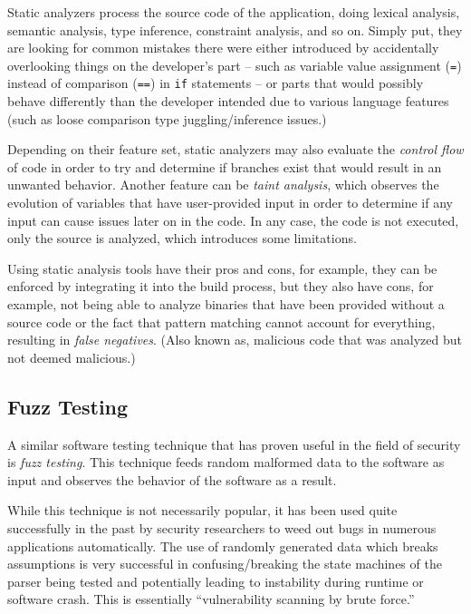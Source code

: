 \documentclass[a4paper,12pt]{article}
\begin{document}
	Static analyzers process the source code of the application, doing lexical analysis, semantic analysis, type inference, constraint analysis, and so on. Simply put, they are looking for common mistakes there were either introduced by accidentally overlooking things on the developer's part -- such as variable value assignment (\texttt{=}) instead of comparison (\texttt{==}) in \texttt{if} statements -- or parts that would possibly behave differently than the developer intended due to various language features (such as loose comparison type juggling/inference issues.)
	
	Depending on their feature set, static analyzers may also evaluate the \textit{control flow} of code in order to try and determine if branches exist that would result in an unwanted behavior. Another feature can be \textit{taint analysis}, which observes the evolution of variables that have user-provided input in order to determine if any input can cause issues later on in the code. In any case, the code is not executed, only the source is analyzed, which introduces some limitations.
	
	Using static analysis tools have their pros and cons, for example, they can be enforced by integrating it into the build process, but they also have cons, for example, not being able to analyze binaries that have been provided without a source code or the fact that pattern matching cannot account for everything, resulting in \textit{false negatives}. (Also known as, malicious code that was analyzed but not deemed malicious.)
	
\subsection{Fuzz Testing} \label{fuzztest}
 
	
	A similar software testing technique that has proven useful in the field of security is \textit{fuzz testing}. This technique feeds random malformed data to the software as input and observes the behavior of the software as a result.
	
	While this technique is not necessarily popular, it has been used quite successfully in the past by security researchers to weed out bugs in numerous applications automatically.\cite{mzalewski15} The use of randomly generated data which breaks assumptions is very successful in confusing/breaking the state machines of the parser being tested and potentially leading to instability during runtime or software crash. This is essentially ``vulnerability scanning by brute force.''
	
\end{document}
